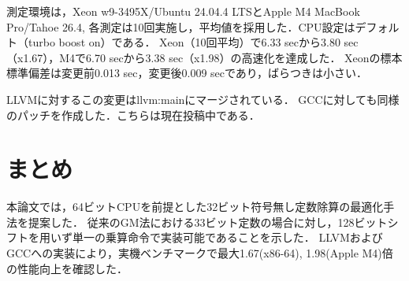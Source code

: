 \documentclass{jarticle}
\begin{document}

測定環境は，Xeon w9-3495X/Ubuntu 24.04.4 LTSとApple M4 MacBook Pro/Tahoe 26.4,
各測定は10回実施し，平均値を採用した．CPU設定はデフォルト（turbo boost on）である．
Xeon（10回平均）で6.33 secから3.80 sec（x1.67），M4で6.70 secから3.38 sec（x1.98）の高速化を達成した．
Xeonの標本標準偏差は変更前0.013 sec，変更後0.009 secであり，ばらつきは小さい．

LLVMに対するこの変更はllvm:mainにマージされている．
GCCに対しても同様のパッチを作成した\cite{GCCpatch}．こちらは現在投稿中である．

\section{まとめ}
本論文では，64ビットCPUを前提とした32ビット符号無し定数除算の最適化手法を提案した．
従来のGM法における33ビット定数の場合に対し，128ビットシフトを用いず単一の乗算命令で実装可能であることを示した．
LLVMおよびGCCへの実装により，実機ベンチマークで最大1.67(x86-64), 1.98(Apple M4)倍の性能向上を確認した．



\end{document}
